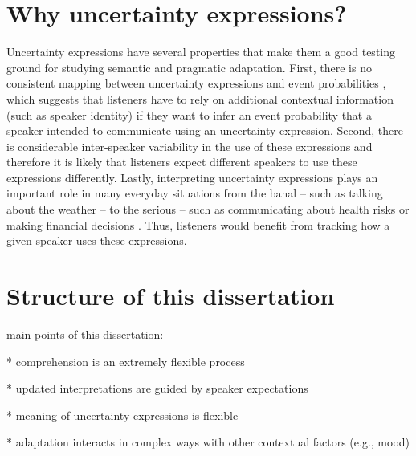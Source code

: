 \section{Why uncertainty expressions?}
\label{sec:why-uncertainty-expressions}

Uncertainty expressions have several properties that make them a good testing ground for studying semantic and pragmatic
adaptation. First, there is no consistent mapping between uncertainty expressions and event probabilities \cite{e.g., Clark1990,Pepper1974}, 
which suggests that listeners have to rely on additional contextual information (such as speaker identity)
if they want to infer an event probability that a speaker intended to communicate using an uncertainty expression. Second, there is considerable inter-speaker variability 
in the use of these expressions \cite{Wallsten1986} and therefore it is likely that listeners expect different speakers to use these expressions
differently. Lastly, interpreting uncertainty expressions plays an important role in many everyday situations from the banal -- 
such as talking about the weather -- to the serious -- such as communicating about health risks 
\cite{Berry2004, Lipkus2007, Politi2007} or making financial decisions \cite{Doupnik2003}. 
Thus, listeners would benefit from tracking  how a given speaker uses these expressions. 

\section{Structure of this dissertation}

main points of this dissertation:

* comprehension is an extremely flexible process 

* updated interpretations are guided by speaker expectations

* meaning of uncertainty expressions is flexible

* adaptation interacts in complex ways with other contextual factors (e.g., mood)

